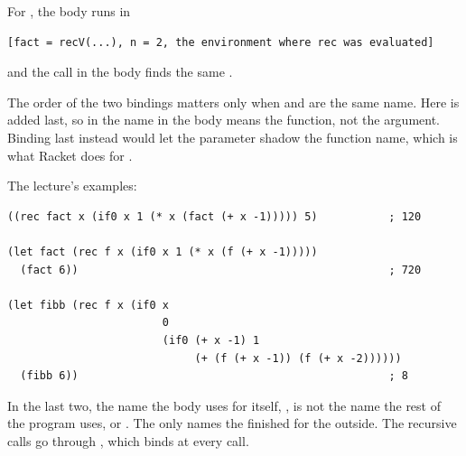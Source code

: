 For , the body runs in
\begin{lstlisting}[style=repl]
[fact = recV(...), n = 2, the environment where rec was evaluated]
\end{lstlisting}
and the call  in the body finds the same .

The order of the two bindings matters only when  and  are the same name. Here  is added last, so in  the name  in the body means the function, not the argument. Binding  last instead would let the parameter shadow the function name, which is what Racket does for .

The lecture's examples:
\begin{lstlisting}
((rec fact x (if0 x 1 (* x (fact (+ x -1))))) 5)           ; 120

(let fact (rec f x (if0 x 1 (* x (f (+ x -1)))))
  (fact 6))                                                ; 720

(let fibb (rec f x (if0 x
                        0
                        (if0 (+ x -1) 1
                             (+ (f (+ x -1)) (f (+ x -2))))))
  (fibb 6))                                                ; 8
\end{lstlisting}
In the last two, the name the body uses for itself, , is not the name the rest of the program uses,  or . The  only names the finished  for the outside. The recursive calls go through , which  binds at every call.
